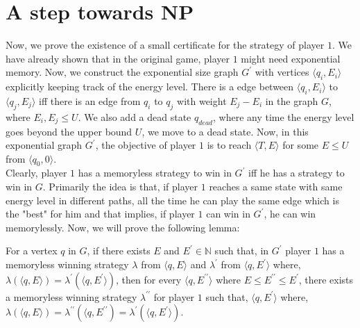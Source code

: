 \section{A step towards NP}
Now, we prove the existence of a small certificate for the strategy of player $1$. We have already shown that in the original game, player $1$ might need exponential memory. Now, we construct the exponential size graph $G^{\prime}$ with vertices $\langle q_i, E_i \rangle$ explicitly keeping track of the energy level. There is a edge between $\langle q_i, E_i \rangle$ to $\langle q_j, E_j \rangle$ iff there is an edge from $q_i$ to $q_j$ with weight $E_j -E_i$ in the graph $G$, where $E_i, E_j \leq U$. We also add a dead state $q_{dead}$, where any time the energy level goes beyond the upper bound $U$, we move to a dead state. Now, in this exponential graph $G^{\prime}$, the objective of player $1$ is to reach $\langle T,E \rangle$ for some $E \leq U$ from $\langle q_0,0 \rangle$.\\
Clearly, player $1$ has a memoryless strategy to win in $G^{\prime}$ iff he has a strategy to win in $G$. Primarily the idea is that, if player $1$ reaches a same state with same energy level in different paths, all the time he can play the same edge which is the "best" for him and that implies, if player $1$ can win in $G^{\prime}$, he can win memorylessly. Now, we will prove the following lemma:
\begin{lemma}
\label{NP-cert}
For a vertex $q$ in $G$, if there exists $E$ and $E^{\prime} \in \mathbb{N}$ such that, in $G^{\prime}$ player $1$ has a memoryless winning strategy $\lambda$ from $\langle q, E \rangle$ and $\lambda^{\prime}$ from $\langle q, E^{\prime} \rangle$ where, $\lambda(\langle q, E \rangle) = \lambda^{\prime}(\langle q, E^{\prime} \rangle)$, then for every $\langle q,E^{\prime \prime} \rangle$ where $E \leq E^{\prime \prime} \leq E^{\prime}$, there exists a memoryless winning strategy $\lambda^{\prime \prime}$ for player $1$ such that,  $\langle q, E^{\prime} \rangle$ where, $\lambda(\langle q, E \rangle) = \lambda^{\prime \prime}(\langle q,E^{\prime \prime})=\lambda^{\prime}(\langle q, E^{\prime} \rangle)$.
\end{lemma}
\vskip 0.1cm
